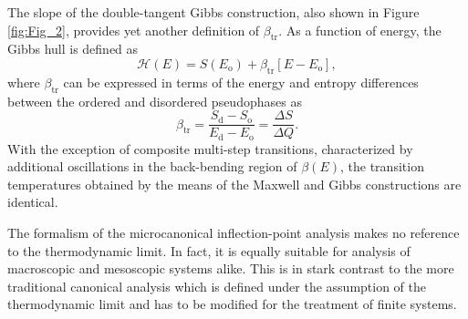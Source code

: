\documentclass[12pt]{report}
\begin{document}
The slope of the double-tangent Gibbs construction, also shown in Figure \ref{fig:Fig_2}, provides yet another definition of $\beta_{\mathrm{tr}}$. As a function of energy, the Gibbs hull is defined as
\begin{equation}
\mathcal{H}(E) = S(E_{\mathrm{o}}) + \beta_{\mathrm{tr}}[E-E_{\mathrm{o}}],
\end{equation}
where $\beta_{\mathrm{tr}}$ can be expressed in terms of the energy and entropy differences between the ordered and disordered pseudophases as
\begin{equation}
\beta_{\mathrm{tr}} = \frac{S_{\mathrm{d}}-S_{\mathrm{o}}}{E_{\mathrm{d}}-E_{\mathrm{o}}} = \frac{\Delta S}{\Delta Q}.
\end{equation}
With the exception of composite multi-step transitions, characterized by additional oscillations in the back-bending region of $\beta(E)$, the transition temperatures obtained by the means of the Maxwell and Gibbs constructions are identical.

The formalism of the microcanonical inflection-point analysis makes no reference to the thermodynamic limit. In fact, it is equally suitable for analysis of macroscopic and mesoscopic systems alike. This is in stark contrast to the more traditional canonical analysis which is defined under the assumption of the thermodynamic limit and has to be modified for the treatment of finite systems.

 
\end{document}
